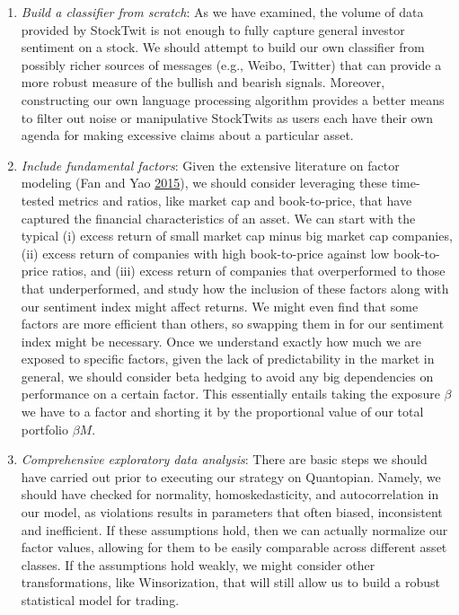 \documentclass[11,]{article}
\begin{document}
\begin{enumerate}
\def\labelenumi{\arabic{enumi}.}
\item
  \emph{Build a classifier from scratch}: As we have examined, the
  volume of data provided by StockTwit is not enough to fully capture
  general investor sentiment on a stock. We should attempt to build our
  own classifier from possibly richer sources of messages (e.g., Weibo,
  Twitter) that can provide a more robust measure of the bullish and
  bearish signals. Moreover, constructing our own language processing
  algorithm provides a better means to filter out noise or manipulative
  StockTwits as users each have their own agenda for making excessive
  claims about a particular asset.
\item
  \emph{Include fundamental factors}: Given the extensive literature on
  factor modeling (Fan and Yao \protect\hyperlink{ref-Fan2015}{2015}),
  we should consider leveraging these time-tested metrics and ratios,
  like market cap and book-to-price, that have captured the financial
  characteristics of an asset. We can start with the typical (i) excess
  return of small market cap minus big market cap companies, (ii) excess
  return of companies with high book-to-price against low book-to-price
  ratios, and (iii) excess return of companies that overperformed to
  those that underperformed, and study how the inclusion of these
  factors along with our sentiment index might affect returns. We might
  even find that some factors are more efficient than others, so
  swapping them in for our sentiment index might be necessary. Once we
  understand exactly how much we are exposed to specific factors, given
  the lack of predictability in the market in general, we should
  consider beta hedging to avoid any big dependencies on performance on
  a certain factor. This essentially entails taking the exposure
  \(\beta\) we have to a factor and shorting it by the proportional
  value of our total portfolio \(\beta M\).
\item
  \emph{Comprehensive exploratory data analysis}: There are basic steps
  we should have carried out prior to executing our strategy on
  Quantopian. Namely, we should have checked for normality,
  homoskedasticity, and autocorrelation in our model, as violations
  results in parameters that often biased, inconsistent and inefficient.
  If these assumptions hold, then we can actually normalize our factor
  values, allowing for them to be easily comparable across different
  asset classes. If the assumptions hold weakly, we might consider other
  transformations, like Winsorization, that will still allow us to build
  a robust statistical model for trading.
\end{enumerate}
\end{document}
